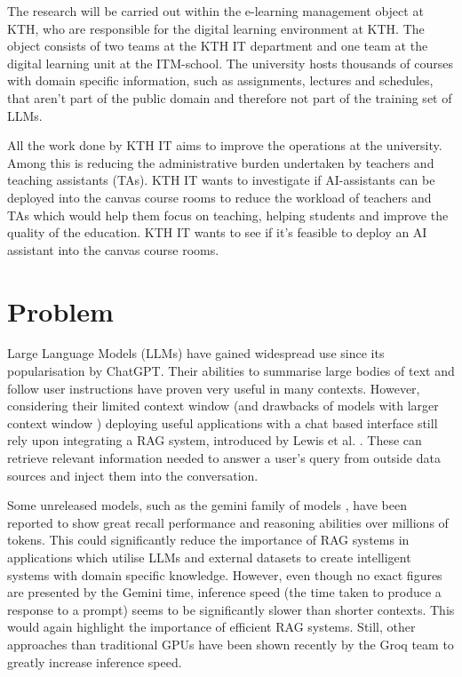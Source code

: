 The research will be carried out within the e-learning management object at KTH, who are responsible for the digital learning environment at KTH. The object consists of two teams at the KTH IT department and one team at the digital learning unit at the ITM-school. The university hosts thousands of courses with domain specific information, such as 
assignments, lectures and schedules, that aren’t part of the public domain and therefore not part of the training set of LLMs.


All the work done by KTH IT aims to improve the operations at the university. Among this is reducing the administrative burden undertaken by teachers and teaching assistants (TAs). KTH IT wants to investigate if AI-assistants can be deployed into the canvas course rooms to reduce the workload of teachers and TAs which would help them focus on teaching, helping students and improve the quality of the education. KTH IT wants to see if it’s feasible to deploy an AI assistant into the canvas course rooms.


\section{Problem}
\label{sec:problem}




Large Language Models (LLMs) have gained widespread use since its popularisation by ChatGPT. Their abilities to summarise large bodies of text and follow user instructions have proven very useful in many contexts. However, considering their limited context window (and drawbacks of models with larger context window \cite{liu_lost_2023}) deploying useful applications with a chat based interface still rely upon integrating a RAG system, introduced by Lewis et al. \cite{lewis_retrieval-augmented_2021}. These can retrieve relevant information needed to answer a user's query from outside data sources and inject them into the conversation.


Some unreleased models, such as the gemini family of models \cite{gemini_team_gemini_2023}, have been reported to show great recall performance and reasoning abilities over millions of tokens. This could significantly reduce the importance of RAG systems in applications which utilise LLMs and external datasets to create intelligent systems with domain specific knowledge. However, even though no exact figures are presented by the Gemini time, inference speed (the time taken to produce a response to a prompt) seems to be significantly slower than shorter contexts. This would again highlight the importance of efficient RAG systems. Still, other approaches than traditional GPUs have been shown recently \cite{abts_software-defined_2022} by the Groq team to greatly increase inference speed.


